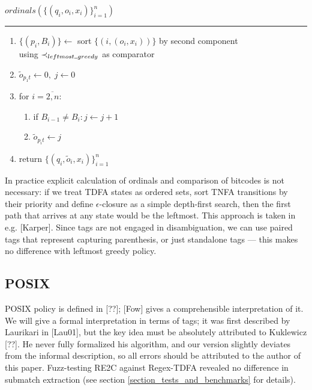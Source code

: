 \documentclass{article}
\newcommand{\Xset}{\!\leftarrow\!}
\newcommand{\Xund}{\rule{.4em}{.4pt}} %
\newcommand{\Xeq}{\!=\!}
\theoremstyle{definition}
\begin{document}
\begin{multicols}{2}
    $ordinals (\{(q_i, o_i, x_i)\}_{i=1}^n)$
    \hrule
    \begin{enumerate}[leftmargin=0in]
    \smallskip
        \item[] $\{(p_i, B_i)\} \Xset $ sort $\{(i, (o_i, x_i))\}$ by second component \\
             using $\prec_{leftmost \Xund greedy}$ as comparator
        \item[] $\widetilde{o}_{p_1 t} \Xset 0, \; j \Xset 0$
        \item[] for $i \Xeq \overline{2, n}$:
        \begin{enumerate}
            \item[] if $B_{i-1} \!\neq\! B_i: j \Xset j \!+\! 1$
            \item[] $\widetilde{o}_{p_i t} \Xset j$
        \end{enumerate}
        \item[] return $\{(q_i, \widetilde{o}_i, x_i)\}_{i=1}^n$
        \\
    \end{enumerate}

    \bigskip

In practice explicit calculation of ordinals and comparison of bitcodes is not necessary:
if we treat TDFA states as ordered sets,
sort TNFA transitions by their priority
and define $\epsilon$-closure as a simple depth-first search,
then the first path that arrives at any state would be the leftmost.
This approach is taken in e.g. [Karper].
Since tags are not engaged in disambiguation,
we can use paired tags that represent capturing parenthesis, or just standalone tags --- this makes no difference with leftmost greedy policy.

\subsection*{POSIX}

POSIX policy is defined in [??]; [Fow] gives a comprehensible interpretation of it.
We will give a formal interpretation in terms of tags;
it was first described by Laurikari in [Lau01], but the key idea must be absolutely attributed to Kuklewicz [??].
He never fully formalized his algorithm, and our version slightly deviates from the informal description,
so all errors should be attributed to the author of this paper.
Fuzz-testing RE2C against Regex-TDFA revealed no difference in submatch extraction
(see section \ref{section_tests_and_benchmarks} for details).
\\


\end{multicols}
\end{document}
